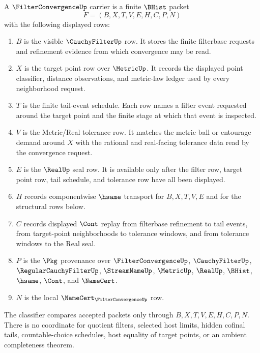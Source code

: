 \begin{definition}
\label{def:filter-convergence-carrier}
A $\FilterConvergenceUp$ carrier is a finite $\BHist$ packet
$$
F=(B,X,T,V,E,H,C,P,N)
$$
with the following displayed rows:
\begin{enumerate}
\item $B$ is the visible $\CauchyFilterUp$ row. It stores the finite filterbase requests and refinement evidence from which convergence may be read.
\item $X$ is the target point row over $\MetricUp$. It records the displayed point classifier, distance observations, and metric-law ledger used by every neighborhood request.
\item $T$ is the finite tail-event schedule. Each row names a filter event requested around the target point and the finite stage at which that event is inspected.
\item $V$ is the Metric/Real tolerance row. It matches the metric ball or entourage demand around $X$ with the rational and real-facing tolerance data read by the convergence request.
\item $E$ is the $\RealUp$ seal row. It is available only after the filter row, target point row, tail schedule, and tolerance row have all been displayed.
\item $H$ records componentwise $\hsame$ transport for $B,X,T,V,E$ and for the structural rows below.
\item $C$ records displayed $\Cont$ replay from filterbase refinement to tail events, from target-point neighborhoods to tolerance windows, and from tolerance windows to the Real seal.
\item $P$ is the $\Pkg$ provenance over $\FilterConvergenceUp$, $\CauchyFilterUp$, $\RegularCauchyFilterUp$, $\StreamNameUp$, $\MetricUp$, $\RealUp$, $\BHist$, $\hsame$, $\Cont$, and $\NameCert$.
\item $N$ is the local $\NameCert_{\FilterConvergenceUp}$ row.
\end{enumerate}
The classifier compares accepted packets only through $B,X,T,V,E,H,C,P,N$. There is no coordinate for quotient filters, selected host limits, hidden cofinal tails, countable-choice schedules, host equality of target points, or an ambient completeness theorem.
\end{definition}

